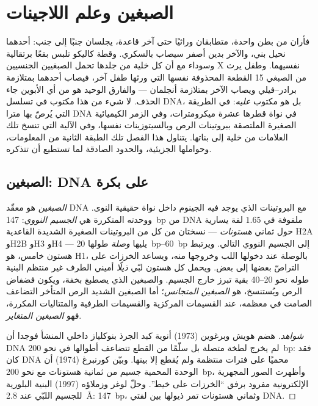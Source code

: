 \chapter{الصبغين وعلم اللاجينات}\label{ch:b3:chromatin-epigenetics}

فأران من بطن واحدة، متطابقان وراثيًا حتى آخر قاعدة، يجلسان جنبًا إلى
جنب: أحدهما نحيل بني، والآخر بدين أصفر سيصاب بالسكري. وقطة كاليكو
تلبس بقعًا برتقالية وسوداء مع أن كل خلية من جلدها تحمل الصبغيين
الجنسيين X نفسيهما. وطفل يرث من الصبغي 15 القطعة المحذوفة نفسها التي
ورثها طفل آخر، فيصاب أحدهما بمتلازمة برادر--فيلي ويصاب الآخر بمتلازمة
أنجلمان --- والفارق الوحيد هو من أي الأبوين جاء الحذف. لا شيء من هذا
مكتوب في تسلسل DNA، بل هو مكتوب \emph{عليه}: في الطريقة التي يُرصّ
بها مترا DNA في نواة قطرها عشرة ميكرومترات، وفي الزمر الكيميائية
الصغيرة الملتصقة ببروتينات الرص وبالسيتوزينات نفسها، وفي الآلية التي
تنسخ تلك العلامات من خلية إلى بناتها. يتناول هذا الفصل تلك الطبقة
الثانية من المعلومات، وحواملها الجزيئية، والحدود الصادقة لما تستطيع
أن تتذكره.

\section{الصبغين: DNA على بكرة}

\begin{definition}\label{def:b3:chromatin-epigenetics:nucleosome}
\emph{الصبغين} هو معقّد DNA مع البروتينات الذي يوجد فيه الجينوم داخل
نواة حقيقية النوى. ووحدته المتكررة هي \emph{الجسيم النووي}:
\qty{147}{bp} من DNA ملفوفة في $1.65$ لفة يسارية حول ثماني
\emph{هستونات} --- نسختان من كل من البروتينات الصغيرة الشديدة
القاعدية H2A وH2B وH3 وH4 --- يليها \emph{وصلة} طولها
\qtyrange{20}{60}{bp} إلى الجسيم النووي التالي. ويرتبط هستون خامس،
هو H1، بالوصلة عند دخولها اللب وخروجها منه، ويساعد الخرزات على
التراصّ بعضها إلى بعض. ويحمل كل هستون لبّي \emph{ذيلًا} أميني الطرف
غير منتظم البنية طوله نحو \numrange{20}{40} بقية تبرز خارج الجسيم.
والصبغين الذي يصطبغ بخفة، ويكون فضفاض الرص ويُستنسخ، هو \emph{الصبغين
المتجانس}؛ أما الصبغين الشديد الرص المتأخر التضاعف الصامت في معظمه،
عند القسيمات المركزية والقسيمات الطرفية والمتتاليات المكررة، فهو
\emph{الصبغين المتغاير}.
\end{definition}

\begin{proof}[شواهد]
هضم هويش وبرغوين (1973) أنوية كبد الجرذ بنوكلياز داخلي المنشأ فوجدا
أن DNA لم يخرج لطخة متصلة بل سلّمًا من القطع تتضاعف أطوالها في نحو
\qty{200}{bp}: فقد كان DNA محميًا على فترات منتظمة ولم يُقطع إلا
بينها. وبيّن كورنبرغ (1974) أن الوحدة المحمية جسيم من ثمانية هستونات
مع نحو \qty{200}{bp}، وأظهرت الصور المجهرية الإلكترونية  مفرود
برفق ``الخرزات على خيط''. وحلّ لوغر وزملاؤه (1997) البنية البلورية
للجسيم اللبّي عند \qty{2.8}{\angstrom}: \qty{147}{bp}، وثماني
هستونات تمر ذيولها بين لفتي DNA.
\end{proof}

